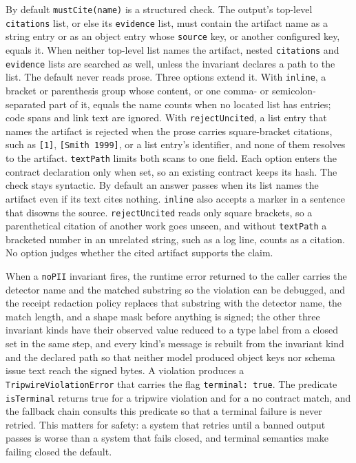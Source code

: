 \documentclass[conference]{IEEEtran}
\newcommand{\code}[1]{\texttt{\small #1}}
\begin{document}
By default \code{mustCite(name)} is a structured check. The output's top-level
\code{citations} list, or else its \code{evidence} list, must contain the artifact name
as a string entry or as an object entry whose \code{source} key, or another configured
key, equals it. When neither top-level list names the artifact, nested
\code{citations} and \code{evidence} lists are searched as well, unless the invariant
declares a path to the list. The default never reads prose. Three options extend it.
With \code{inline}, a bracket or parenthesis group whose content, or one comma- or
semicolon-separated part of it, equals the name counts when no located list has
entries; code spans and link text are ignored. With \code{rejectUncited}, a list entry
that names the artifact is rejected when the prose carries square-bracket citations,
such as \code{[1]}, \code{[Smith 1999]}, or a list entry's identifier, and none of them
resolves to the artifact. \code{textPath} limits both scans to one field. Each option
enters the contract declaration only when set, so an existing contract keeps its hash.
The check stays syntactic. By default an answer passes when its list names the
artifact even if its text cites nothing. \code{inline} also accepts a marker in a
sentence that disowns the source. \code{rejectUncited} reads only square brackets, so a
parenthetical citation of another work goes unseen, and without \code{textPath} a
bracketed number in an unrelated string, such as a log line, counts as a citation. No
option judges whether the cited artifact supports the claim.

When a \code{noPII} invariant fires, the runtime error
returned to the caller carries the detector name and the matched substring so the
violation can be debugged, and the receipt redaction policy replaces that substring
with the detector name, the match length, and a shape mask before anything is signed;
the other three invariant kinds have their observed value reduced to a type label from a
closed set in the same step, and every kind's message is rebuilt from the invariant kind
and the declared path so that neither model produced object keys nor schema issue
text reach the signed bytes. A violation produces a \code{TripwireViolationError} that carries the
flag \code{terminal: true}. The predicate \code{isTerminal} returns true for a
tripwire violation and for a no contract match, and the fallback chain consults this
predicate so that a terminal failure is never retried. This matters for safety: a
system that retries until a banned output passes is worse than a system that fails
closed, and terminal semantics make failing closed the default.
\end{document}
